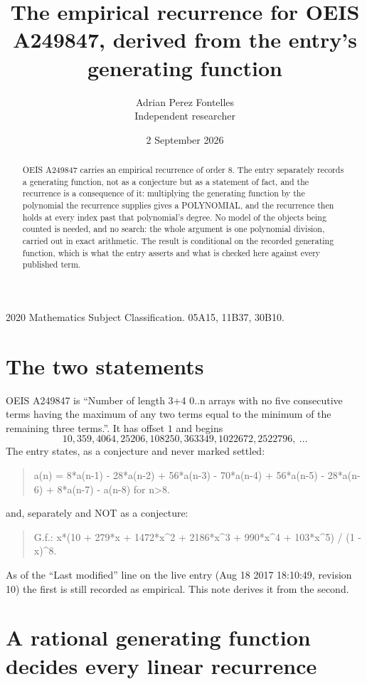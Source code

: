 \documentclass[11pt,a4paper]{article}
\title{The empirical recurrence for OEIS A249847, derived from the entry's generating function}
\author{Adrian Perez Fontelles\\ \small Independent researcher}
\date{2 September 2026}
\theoremstyle{plain}
\theoremstyle{definition}
\begin{document}
\maketitle

\begin{abstract}
OEIS A249847 carries an empirical recurrence of order $8$. The entry separately records a
generating function, not as a conjecture but as a statement of fact, and the recurrence is a
consequence of it: multiplying the generating function by the polynomial the recurrence
supplies gives a POLYNOMIAL, and the recurrence then holds at every index past that
polynomial's degree. No model of the objects being counted is needed, and no search: the
whole argument is one polynomial division, carried out in exact arithmetic. The result is
conditional on the recorded generating function, which is what the entry asserts and what is
checked here against every published term.
\end{abstract}

\noindent\small 2020 Mathematics Subject Classification. 05A15, 11B37, 30B10.\normalsize

\section{The two statements}

OEIS A249847 is ``Number of length 3+4 0..n arrays with no five consecutive terms having the maximum of any two terms equal to the minimum of the remaining three terms.''. It has offset $1$ and begins
\[
10, 359, 4064, 25206, 108250, 363349, 1022672, 2522796,\ \dots
\]
The entry states, as a conjecture and never marked settled:
\begin{quote}
a(n) = 8*a(n-1) - 28*a(n-2) + 56*a(n-3) - 70*a(n-4) + 56*a(n-5) - 28*a(n-6) + 8*a(n-7) - a(n-8) for n>8.
\end{quote}
and, separately and NOT as a conjecture:
\begin{quote}
G.f.: x*(10 + 279*x + 1472*x\^{}2 + 2186*x\^{}3 + 990*x\^{}4 + 103*x\^{}5) / (1 - x)\^{}8.
\end{quote}
As of the ``Last modified'' line on the live entry (Aug 18 2017 18:10:49, revision 10) the first is still
recorded as empirical. This note derives it from the second.

\section{A rational generating function decides every linear recurrence}
\end{document}

